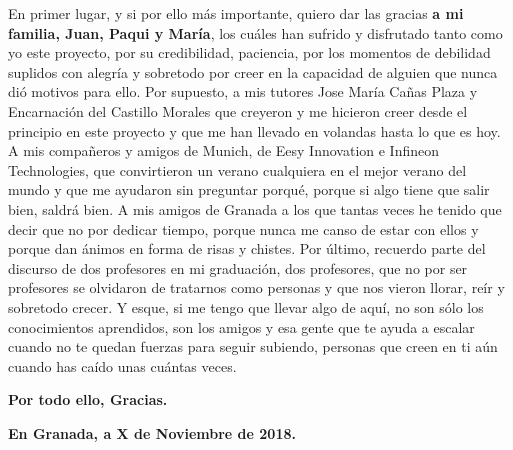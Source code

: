 En primer lugar, y si por ello más importante, quiero dar las gracias {\bf a mi familia, Juan, Paqui y María}, los cuáles han sufrido y disfrutado tanto como yo este proyecto, por su credibilidad, paciencia, por los momentos de debilidad suplidos con alegría y sobretodo por creer en la capacidad de alguien que nunca dió motivos para ello.  \newline
Por supuesto, a mis tutores Jose María Cañas Plaza y Encarnación del Castillo Morales que creyeron y me hicieron creer desde el principio en este proyecto y que me han llevado en volandas hasta lo que es hoy. \newline
A mis compañeros y amigos de Munich, de Eesy Innovation e Infineon Technologies, que convirtieron un verano cualquiera en el mejor verano del mundo y que me ayudaron sin preguntar porqué, porque si algo tiene que salir bien, saldrá bien. \newline 
A mis amigos de Granada a los que tantas veces he tenido que decir que no por dedicar tiempo, porque nunca me canso de estar con ellos y porque dan ánimos en forma de risas y chistes.\newline
Por último, recuerdo parte del discurso de dos profesores en mi graduación, dos profesores, que no por ser profesores se olvidaron de tratarnos como personas y que nos vieron llorar, reír y sobretodo crecer. Y esque, si me tengo que llevar algo de aquí, no son sólo los conocimientos aprendidos, son los amigos y esa gente que te ayuda a escalar cuando no te quedan fuerzas para seguir subiendo, personas que creen en ti aún cuando has caído unas cuántas veces.

{\bf Por todo ello, Gracias.}

\vspace{1cm}

{\bf En Granada, a X de Noviembre de 2018.}


